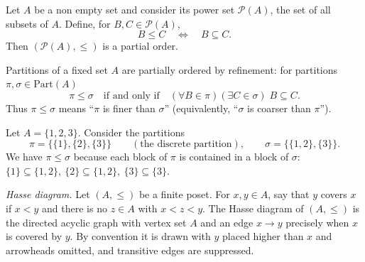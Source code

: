 \begin{example}
  Let $A$ be a non empty set and consider its power set $\mathcal{P}(A)$, the set of all subsets of $A$. Define, for $B,C\in\mathcal{P}(A)$,
  \[
  B\le C \quad\Longleftrightarrow\quad B\subseteq C.
  \]
  Then $(\mathcal{P}(A),\le)$ is a partial order.
\end{example}



\begin{example}
  Partitions of a fixed set $A$ are partially ordered by refinement: for partitions $\pi,\sigma\in \mathrm{Part}(A)$
  \[
  \pi\le \sigma \quad\mbox{if and only if}\quad
  (\forall B\in\pi)(\exists C\in\sigma)\; B\subseteq C.
  \]
  Thus $\pi\le\sigma$ means “$\pi$ is finer than $\sigma$” (equivalently, “$\sigma$ is coarser than $\pi$”). 
\end{example}

\begin{example}
Let \(A=\{1,2,3\}\). Consider the partitions
\[
\pi=\{\{1\},\{2\},\{3\}\}\qquad(\text{the discrete partition}),
\qquad
\sigma=\{\{1,2\},\{3\}\}.
\]
We have \(\pi\le\sigma\) because each block of \(\pi\) is contained in a block of \(\sigma\):
\(\{1\}\subseteq\{1,2\},\ \{2\}\subseteq\{1,2\},\ \{3\}\subseteq\{3\}\).
\end{example}

\begin{definition}
  \emph{Hasse diagram.}
  Let $(A,\le)$ be a finite poset. For $x,y\in A$, say that $y$ covers $x$ if $x<y$ and there is no $z\in A$ with $x<z<y$. The Hasse diagram of $(A,\le)$ is the directed acyclic graph with vertex set $A$ and an edge $x\to y$ precisely when $x$ is covered by $y$. By convention it is drawn with $y$ placed higher than $x$ and arrowheads omitted, and transitive edges are suppressed. 
\begin{center}
\end{center}
\end{definition}




